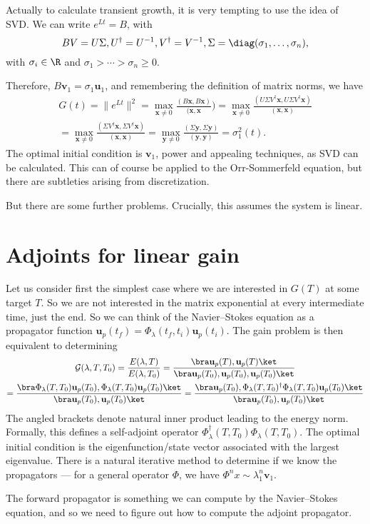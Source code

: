 \documentclass[a4paper]{article}
\begin{document}
Actually to calculate transient growth, it is very tempting to use the idea of SVD. We can write $e^{Lt} = B$, with
\[
  BV = U\Sigma, U^\dagger = U^{-1}, V^\dagger = V^{-1}, \Sigma = \diag(\sigma_1, \ldots, \sigma_n),
\]
with $\sigma_i \in \R$ and $\sigma_1 > \cdots > \sigma_n \geq 0$.

Therefore, $B\mathbf{v}_1 = \sigma_1 \mathbf{u}_1$, and remembering the definition of matrix norms, we have
\begin{multline*}
  G(t) =\|e^{Lt}\|^2 = \max_{\mathbf{x} \not= 0} \frac{(B\mathbf{x}, B\mathbf{x})}{(\mathbf{x}, \mathbf{x}}) = \max_{\mathbf{x} \not= 0} \frac{(U\Sigma V^\dagger \mathbf{x}, U\Sigma V^\dagger \mathbf{x})}{(\mathbf{x}, \mathbf{x})}\\
  = \max_{\mathbf{x} \not= 0} \frac{(\Sigma V^\dagger \mathbf{x}, \Sigma V^\dagger \mathbf{x})}{(\mathbf{x}, \mathbf{x})} = \max_{\mathbf{y} \not= 0} \frac{(\Sigma \mathbf{y}, \Sigma \mathbf{y})}{(\mathbf{y}, \mathbf{y})} = \sigma_1^2(t).
\end{multline*}
The optimal initial condition is $\mathbf{v}_1$, power and appealing techniques, as SVD can be calculated. This can of course be applied to the Orr-Sommerfeld equation, but there are subtleties arising from discretization.

But there are some further problems. Crucially, this assumes the system is linear.

\section{Adjoints for linear gain}
Let us consider first the simplest case where we are interested in $G(T)$ at some target $T$. So we are not interested in the matrix exponential at every intermediate time, just the end. So we can think of the Navier--Stokes equation as a propagator function $\mathbf{u}_p(t_f) = \Phi_\lambda(t_f, t_i) \mathbf{u}_p(t_i)$. The gain problem is then equivalent to determining
\begin{multline*}
  \mathcal{G}(\lambda, T, T_0) = \frac{E(\lambda, T)}{ E(\lambda, T_0)} = \frac{\bra \mathbf{u}_p(T), \mathbf{u}_p(T)\ket}{ \bra \mathbf{u}_p(T_0), \mathbf{u}_p(T_0), \mathbf{u}_p(T_0)\ket}\\
  = \frac{\bra \Phi_\lambda (T, T_0) \mathbf{u}_p(T_0), \Phi_\lambda(T, T_0) \mathbf{u}_p(T_0)\ket}{\bra \mathbf{u}_p(T_0), \mathbf{u}_p(T_0)\ket} = \frac{\bra  \mathbf{u}_p(T_0), \Phi_\lambda (T, T_0)^\dagger \Phi_\lambda(T, T_0) \mathbf{u}_p(T_0)\ket}{\bra \mathbf{u}_p(T_0), \mathbf{u}_p(T_0)\ket}
\end{multline*}
The angled brackets denote natural inner product leading to the energy norm. Formally, this defines a self-adjoint operator $\Phi_\lambda^\dagger (T, T_0) \Phi_\lambda(T, T_0)$. The optimal initial condition is the eigenfunction/state vector associated with the largest eigenvalue. There is a natural iterative method to determine if we know the propagators --- for a general operator $\Phi$, we have $\Phi^n x \sim \lambda_1^n \mathbf{v}_1$.

The forward propagator is something we can compute by the Navier--Stokes equation, and so we need to figure out how to compute the adjoint propagator.
\printindex
\end{document}
